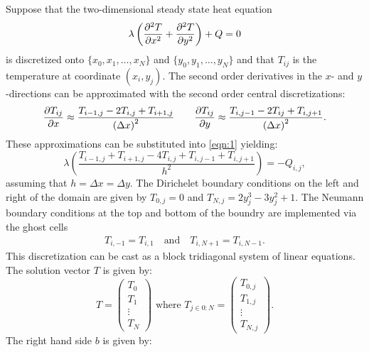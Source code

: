 \documentclass[reqno, 12pt]{amsart}
\begin{document}
    \noindent Suppose that the two-dimensional steady state heat equation
    \begin{equation}
        \lambda\left(\pdifftwo[T]{x} + \pdifftwo[T]{y}\right) + Q = 0 \label{eqn:1}
    \end{equation}
    is discretized onto $\{x_0, x_1, \dots, x_N\}$ and $\{y_0, y_1, \dots, y_N\}$ and that $T_{ij}$ is the temperature at coordinate $(x_i, y_j)$.
    The second order derivatives in the $x$- and $y$-directions can be approximated with the second order central discretizations:
    \begin{equation*}
        \pdiff[T_{ij}]{x} \approx \frac{T_{i-1,j} - 2 T_{i,j} + T_{i + 1,j}}{\left(\Delta x\right)^2}
        \qquad
        \pdiff[T_{ij}]{y} \approx \frac{T_{i, j-1} - 2T_{ij} + T_{i, j + 1}}{\left(\Delta x\right)^2}.
    \end{equation*}
    These approximations can be substituted into \cref{eqn:1} yielding:
    \begin{equation*}
        \lambda\left(\frac{T_{i-1,j} + T_{i + 1,j} - 4T_{i,j} + T_{i,j-1} + T_{i,j + 1}}{h^2}\right) = -Q_{i,j},
    \end{equation*}
    assuming that $h = \Delta x = \Delta y$.
    The Dirichelet boundary conditions on the left and right of the domain are given by $T_{0,j} = 0$ and $T_{N,j} = 2y_j^3 - 3y_j^2 + 1$.
    The Neumann boundary conditions at the top and bottom of the boundry are implemented via the ghost cells
    \begin{align*}
        T_{i,-1} = T_{i,1} \quad \text{and} \quad T_{i, N+1} = T_{i,N-1}.
    \end{align*}
    This discretization can be cast as a block tridiagonal system of linear equations.
    The solution vector $T$ is given by:
    \begin{equation*}
        T = \begin{pmatrix} T_0 \\ T_1 \\ \vdots \\ T_N \end{pmatrix}
        \text{ where }
        T_{j\in 0:N} = \begin{pmatrix} T_{0,j} \\ T_{1,j} \\ \vdots \\ T_{N,j} \end{pmatrix}.
    \end{equation*}
    The right hand side $b$ is given by:
\end{document}
